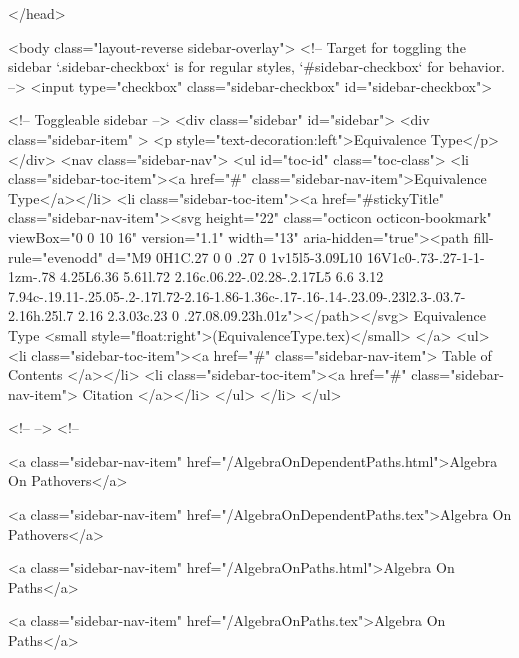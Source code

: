 </head>


  <body class="layout-reverse sidebar-overlay">
    <!-- Target for toggling the sidebar `.sidebar-checkbox` is for regular
     styles, `#sidebar-checkbox` for behavior. -->
<input type="checkbox" class="sidebar-checkbox" id="sidebar-checkbox">

<!-- Toggleable sidebar -->
<div class="sidebar" id="sidebar">
  <div class="sidebar-item" >
    <p style="text-decoration:left">Equivalence Type</p>
  </div>
  <nav class="sidebar-nav">
    <ul id="toc-id" class="toc-class">
  <li class="sidebar-toc-item"><a href="#" class="sidebar-nav-item">Equivalence Type</a></li>
  <li class="sidebar-toc-item"><a href="#stickyTitle" class="sidebar-nav-item"><svg height="22" class="octicon octicon-bookmark" viewBox="0 0 10 16" version="1.1" width="13" aria-hidden="true"><path fill-rule="evenodd" d="M9 0H1C.27 0 0 .27 0 1v15l5-3.09L10 16V1c0-.73-.27-1-1-1zm-.78 4.25L6.36 5.61l.72 2.16c.06.22-.02.28-.2.17L5 6.6 3.12 7.94c-.19.11-.25.05-.2-.17l.72-2.16-1.86-1.36c-.17-.16-.14-.23.09-.23l2.3-.03.7-2.16h.25l.7 2.16 2.3.03c.23 0 .27.08.09.23h.01z"></path></svg> Equivalence Type <small style="float:right">(EquivalenceType.tex)</small>
</a>
    <ul>
      <li class="sidebar-toc-item"><a href="#" class="sidebar-nav-item"> Table of Contents </a></li>
      <li class="sidebar-toc-item"><a href="#" class="sidebar-nav-item"> Citation </a></li>
    </ul>
  </li>
</ul>


    <!--  -->
    <!-- 
      
    
      
    
      
    
      
        
      
    
      
        
          <a class="sidebar-nav-item" href="/AlgebraOnDependentPaths.html">Algebra On Pathovers</a>
        
      
    
      
        
          <a class="sidebar-nav-item" href="/AlgebraOnDependentPaths.tex">Algebra On Pathovers</a>
        
      
    
      
        
          <a class="sidebar-nav-item" href="/AlgebraOnPaths.html">Algebra On Paths</a>
        
      
    
      
        
          <a class="sidebar-nav-item" href="/AlgebraOnPaths.tex">Algebra On Paths</a>
        
